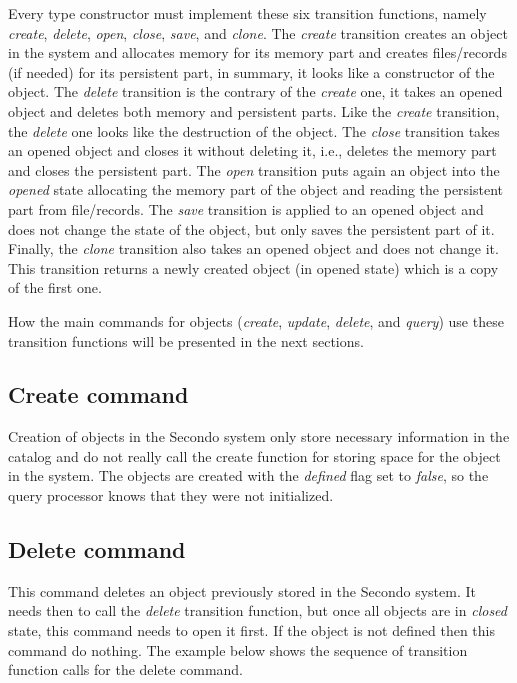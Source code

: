 \documentclass [11pt, a4paper] {article}
\begin{document}
Every type constructor must implement these six transition functions, namely \emph{create}, \emph{delete}, \emph{open}, \emph{close}, \emph{save}, and \emph{clone}. The \emph{create} transition creates an object in the system and allocates memory for its memory part and creates files/records (if needed) for its persistent part, in summary, it looks like a constructor of the object. The \emph{delete} transition is the contrary of the \emph{create} one, it takes an opened object and deletes both memory and persistent parts. Like the \emph{create} transition, the \emph{delete} one looks like the destruction of the object. The \emph{close} transition takes an opened object and closes it without deleting it, i.e., deletes the memory part and closes the persistent part. The \emph{open} transition puts again an object into the \emph{opened} state allocating the memory part of the object and reading the persistent part from file/records. The \emph{save} transition is applied to an opened object and does not change the state of the object, but only saves the persistent part of it. Finally, the \emph{clone} transition also takes an opened object and does not change it. This transition returns a newly created object (in opened state) which is a copy of the first one.  
     
How the main commands for objects (\emph{create}, \emph{update}, \emph{delete}, and \emph{query}) use these transition functions will be presented in the next sections.

\subsection{Create command}

Creation of objects in the Secondo system only store necessary information in the catalog and do not really call the create function for storing space for the object in the system. The objects are created with the \emph{defined} flag set to \emph{false}, so the query processor knows that they were not initialized.

\subsection{Delete command}

This command deletes an object previously stored in the Secondo system. It needs then to call the \emph{delete} transition function, but once all objects are in \emph{closed} state, this command needs to open it first. If the object is not defined then this command do nothing. The example below shows the sequence of transition function calls for the delete command.
\end{document}
